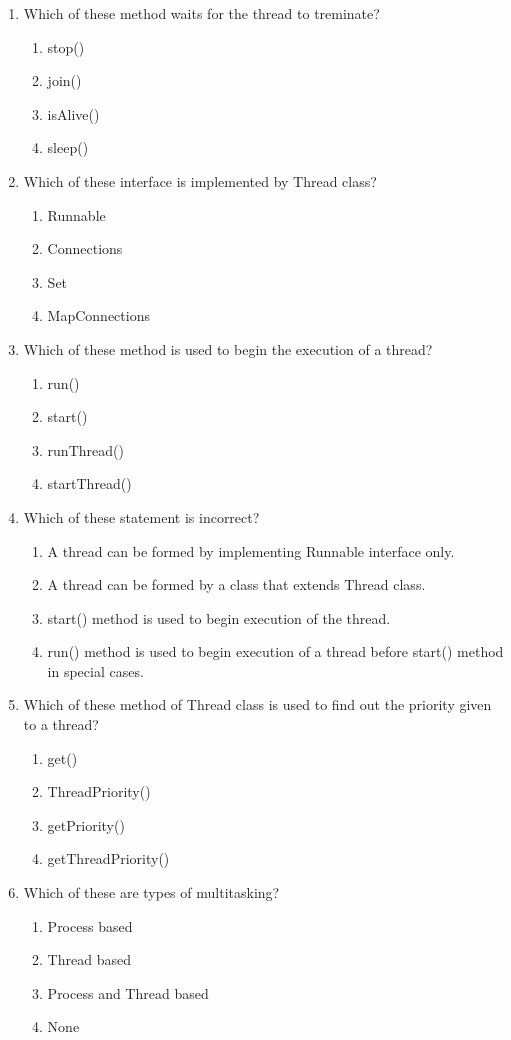 \documentclass[11pt,a4paper]{article}
\begin{document}
\begin{enumerate}
\item Which of these method waits for the thread to treminate?
\begin{enumerate}
\item stop()
\item join()
\item isAlive()
\item sleep()
\end{enumerate}
\item Which of these interface is implemented by Thread class?
\begin{enumerate}
\item Runnable
\item Connections
\item Set
\item MapConnections
\end{enumerate}
\item Which of these method is used to begin the execution of a thread?
\begin{enumerate}
\item run()
\item start()
\item runThread()
\item startThread()
\end{enumerate}
\item Which of these statement is incorrect?
\begin{enumerate}
\item A thread can be formed by implementing Runnable interface only.
\item A thread can be formed by a class that extends Thread class.
\item start() method is used to begin execution of the thread.
\item run() method is used to begin execution of a thread before start() method in special cases.
\end{enumerate}
\item Which of these method of Thread class is used to find out the priority given to a thread?
\begin{enumerate}
\item get()
\item ThreadPriority()
\item getPriority()
\item getThreadPriority()
\end{enumerate}
\item Which of these are types of multitasking?
\begin{enumerate}
\item Process based
\item Thread based
\item Process and Thread based
\item None
\end{enumerate}
\end{enumerate}
\end{document}
